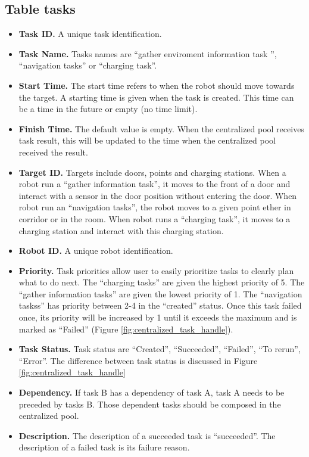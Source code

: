 \subsection*{Table tasks}
\begin{itemize}
 \label{sec:task_table}
 \item \textbf{Task ID.} A unique task identification.
 \item \textbf{Task Name.} Tasks names are ``gather enviroment information task '', ``navigation tasks'' or ``charging task''.
 \item \textbf{Start Time.} The start time refers to when the robot should move towards the target. A starting time is given when the task is created. This time can be a time in the future or empty (no time limit). 
 \item \textbf{Finish Time.} The default value is empty. When the centralized pool receives task result, this  will be updated to the time when the centralized pool received the result.
 \item \textbf{Target ID.} Targets include doors, points and charging stations. When a robot run a ``gather information task'', it moves to the front of a door and interact with a sensor in the door position without entering the door. 
 When robot run an ``navigation tasks'', the robot moves to a given point ether in corridor or in the room. When robot runs a ``charging task'', it moves to a charging station and interact with this charging station.
 \item \textbf{Robot ID.} A unique robot identification.
 \item \textbf{Priority.} Task priorities allow user to easily prioritize tasks to clearly plan what to do next. The ``charging tasks'' are given the highest priority of 5. The ``gather information tasks'' are given the lowest priority of 1. The ``navigation taskss'' has priority between 2-4 in the ``created'' status. Once this task failed once, its priority will be increased by 1 until it exceeds the maximum and is marked as ``Failed'' (Figure \ref{fig:centralized_task_handle}).
 \item \textbf{Task Status.} Task status are ``Created'', ``Succeeded'', ``Failed'', ``To rerun'', ``Error''. The difference between task status is discussed in Figure \ref{fig:centralized_task_handle}
 \item \textbf{Dependency.} If task B has a dependency of task A, task A needs to be preceded by tasks B. Those dependent tasks should be composed in the centralized pool.
 \item \textbf{Description.} The description of a succeeded task is ``succeeded''. The description of a failed task is its failure reason.

\end{itemize}

